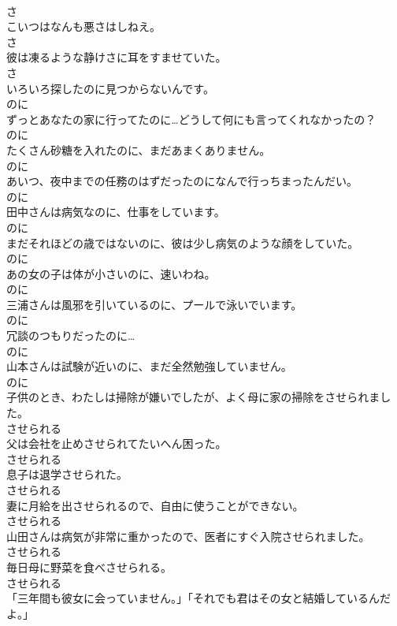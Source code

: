 \documentclass[8pt]{extreport}
\begin{document}
\begin{CJK}{UTF8}{min}
\\	さ
\\	こいつはなんも悪さはしねえ。	
\\	さ
\\	彼は凍るような静けさに耳をすませていた。	
\\	さ
\\	いろいろ探したのに見つからないんです。	
\\	のに
\\	ずっとあなたの家に行ってたのに…どうして何にも言ってくれなかったの？	
\\	のに
\\	たくさん砂糖を入れたのに、まだあまくありません。	
\\	のに
\\	あいつ、夜中までの任務のはずだったのになんで行っちまったんだい。	
\\	のに
\\	田中さんは病気なのに、仕事をしています。	
\\	のに
\\	まだそれほどの歳ではないのに、彼は少し病気のような顔をしていた。	
\\	のに
\\	あの女の子は体が小さいのに、速いわね。	
\\	のに
\\	三浦さんは風邪を引いているのに、プールで泳いでいます。	
\\	のに
\\	冗談のつもりだったのに…	
\\	のに
\\	山本さんは試験が近いのに、まだ全然勉強していません。	
\\	のに
\\	子供のとき、わたしは掃除が嫌いでしたが、よく母に家の掃除をさせられました。	
\\	させられる
\\	父は会社を止めさせられてたいへん困った。	
\\	させられる
\\	息子は退学させられた。	
\\	させられる
\\	妻に月給を出させられるので、自由に使うことができない。	
\\	させられる
\\	山田さんは病気が非常に重かったので、医者にすぐ入院させられました。	
\\	させられる
\\	毎日母に野菜を食べさせられる。	
\\	させられる
\\	「三年間も彼女に会っていません。」「それでも君はその女と結婚しているんだよ。」	

\end{CJK}
\end{document}
